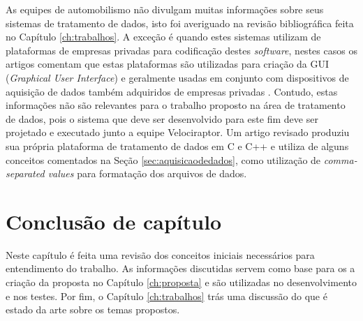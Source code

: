 As equipes de automobilismo não divulgam muitas informações sobre seus sistemas de tratamento de dados, isto foi averiguado na revisão bibliográfica feita no Capítulo \ref{ch:trabalhos}. A exceção é quando estes sistemas utilizam de plataformas de empresas privadas para codificação destes \textit{software}, nestes casos os artigos comentam que estas plataformas são utilizadas para criação da GUI (\textit{Graphical User Interface}) e geralmente usadas em conjunto com dispositivos de aquisição de dados também adquiridos de empresas privadas \cite{applicationOfData2010}\cite{vehicleDataAcquisition2014}\cite{designAndImplementation2015}\cite{developmentOfAn2016}. Contudo, estas informações não são relevantes para o trabalho proposto na área de tratamento de dados, pois o sistema que deve ser desenvolvido para este fim deve ser projetado e executado junto a equipe Velociraptor. Um artigo revisado produziu sua própria plataforma de tratamento de dados em C e C++ \cite{racecarInstrumentationFor2012} e utiliza de alguns conceitos comentados na Seção \ref{sec:aquisicaodedados}, como utilização de \textit{comma-separated values} para formatação dos arquivos de dados. 

\section{Conclusão de capítulo}
Neste capítulo é feita uma revisão dos conceitos iniciais necessários para entendimento do trabalho. As informações discutidas servem como base para os a criação da proposta no Capítulo \ref{ch:proposta} e são utilizadas no desenvolvimento e nos testes. Por fim, o Capítulo \ref{ch:trabalhos} trás uma discussão do que é estado da arte sobre os temas propostos.  


